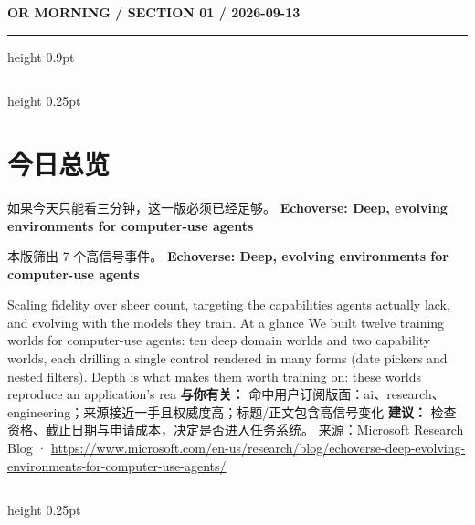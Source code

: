 \documentclass[10.5pt]{ctexart}
\begin{document}
{\small\bfseries OR MORNING / SECTION 01 / 2026-09-13}
\vspace{2mm}
\hrule height 0.9pt
\vspace{1.5mm}
\hrule height 0.25pt
\vspace{4mm}
\section*{今日总览}
{\color{ormuted} 如果今天只能看三分钟，这一版必须已经足够。}
\vspace{2mm}
{\fontsize{25}{29}\selectfont\bfseries Echoverse: Deep, evolving environments for computer-use agents}\par
\vspace{2mm}
{\large 本版筛出 7 个高信号事件。}
\vspace{3mm}
{\Large\bfseries Echoverse: Deep, evolving environments for computer-use agents}\par
Scaling fidelity over sheer count, targeting the capabilities agents actually lack, and evolving with the models they train. At a glance We built twelve training worlds for computer-use agents: ten deep domain worlds and two capability worlds, each drilling a single control rendered in many forms (date pickers and nested filters). Depth is what makes them worth training on: these worlds reproduce an application’s rea
\textbf{与你有关：} 命中用户订阅版面：ai、research、engineering；来源接近一手且权威度高；标题/正文包含高信号变化
\textbf{建议：} 检查资格、截止日期与申请成本，决定是否进入任务系统。
{\footnotesize\color{ormuted} 来源：Microsoft Research Blog · \url{https://www.microsoft.com/en-us/research/blog/echoverse-deep-evolving-environments-for-computer-use-agents/}}
\vspace{3mm}
\hrule height 0.25pt
\vspace{3mm}
\end{document}
